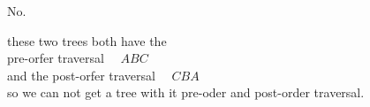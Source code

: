 \begin{parts}
    \vspace{2cm}
    No.

   

    \vspace{2cm}


    these two trees both have the \\
    pre-orfer traversal \ \ $ABC$\\
    and the post-orfer traversal \ \ $CBA$\\
    so we can not get a tree with it pre-oder and post-order traversal.
\end{parts}